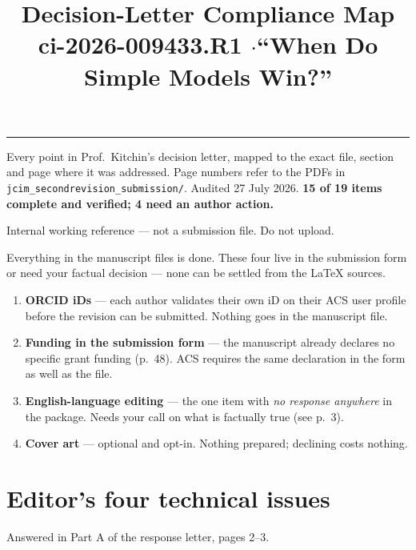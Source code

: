 \documentclass[11pt]{article}
\title{\vspace{-2.2em}\bfseries Decision-Letter Compliance Map\\[0.35em]
\large\mdseries ci-2026-009433.R1 \quad$\cdot$\quad ``When Do Simple Models Win?''}
\author{}
\date{}
\begin{document}
\maketitle
\vspace{-3.2em}

\textcolor{rulegrey}{\rule{\linewidth}{1pt}}

{\small Every point in Prof.\ Kitchin's decision letter, mapped to the exact file, section and page
where it was addressed. Page numbers refer to the PDFs in \texttt{jcim\_secondrevision\_submission/}.
Audited 27 July 2026. \textbf{15 of 19 items complete and verified; 4 need an author action.}}

{\footnotesize\color{inkmute} Internal working reference --- not a submission file. Do not upload.}

\begin{tcolorbox}[colback=boxbg,colframe=act,boxrule=1pt,left=8pt,right=8pt,top=6pt,bottom=6pt,
                  title={\bfseries Four items only you can complete}, coltitle=white, colbacktitle=act]
Everything in the manuscript files is done. These four live in the submission form or need your
factual decision --- none can be settled from the \LaTeX{} sources.
\begin{enumerate}[leftmargin=1.4em,itemsep=3pt,topsep=4pt]
  \item \textbf{ORCID iDs} --- each author validates their own iD on their ACS user profile before
        the revision can be submitted. Nothing goes in the manuscript file.
  \item \textbf{Funding in the submission form} --- the manuscript already declares no specific grant
        funding (p.~48). ACS requires the same declaration in the form as well as the file.
  \item \textbf{English-language editing} --- the one item with \emph{no response anywhere} in the
        package. Needs your call on what is factually true (see p.~3).
  \item \textbf{Cover art} --- optional and opt-in. Nothing prepared; declining costs nothing.
\end{enumerate}
\end{tcolorbox}

\section{Editor's four technical issues}
{\small\color{inkmute} Answered in Part A of the response letter, pages 2--3.}
\end{document}
